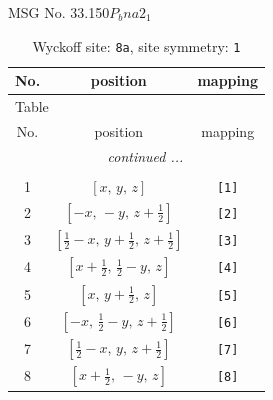 \documentclass[fleqn,8pt]{jsarticle}
\begin{document}
\setcounter{MaxMatrixCols}{32}

\renewcommand{\tablename}{Table~}
\renewcommand{\figurename}{Figure~}
\begin{center}
\LARGE
MSG No. 33.150\quad$P_{b}na2_{1}$
\end{center}
\renewcommand{\arraystretch}{1.2}
\begin{longtable}{ccc}
\caption{Wyckoff site: {\tt 8a}, site symmetry: {\tt 1}}
 \\
 \hline \hline
No. & position & mapping \\ \hline \endfirsthead

\multicolumn{2}{l}{\tablename\ \thetable{}} \\
 \hline \hline
No. & position & mapping \\ \hline \endhead

 \hline \hline
\multicolumn{2}{r}{\footnotesize\it continued ...} \\ \endfoot

 \hline \hline
\multicolumn{2}{r}{} \\ \endlastfoot

1 & $\left[ x,\, y,\, z \right]$ & {\tt [1]} \\ \hline
2 & $\left[ - x,\, - y,\, z + \frac{1}{2} \right]$ & {\tt [2]} \\ \hline
3 & $\left[ \frac{1}{2} - x,\, y + \frac{1}{2},\, z + \frac{1}{2} \right]$ & {\tt [3]} \\ \hline
4 & $\left[ x + \frac{1}{2},\, \frac{1}{2} - y,\, z \right]$ & {\tt [4]} \\ \hline
5 & $\left[ x,\, y + \frac{1}{2},\, z \right]$ & {\tt [5]} \\ \hline
6 & $\left[ - x,\, \frac{1}{2} - y,\, z + \frac{1}{2} \right]$ & {\tt [6]} \\ \hline
7 & $\left[ \frac{1}{2} - x,\, y,\, z + \frac{1}{2} \right]$ & {\tt [7]} \\ \hline
8 & $\left[ x + \frac{1}{2},\, - y,\, z \right]$ & {\tt [8]} \\
\end{longtable}
\end{document}
